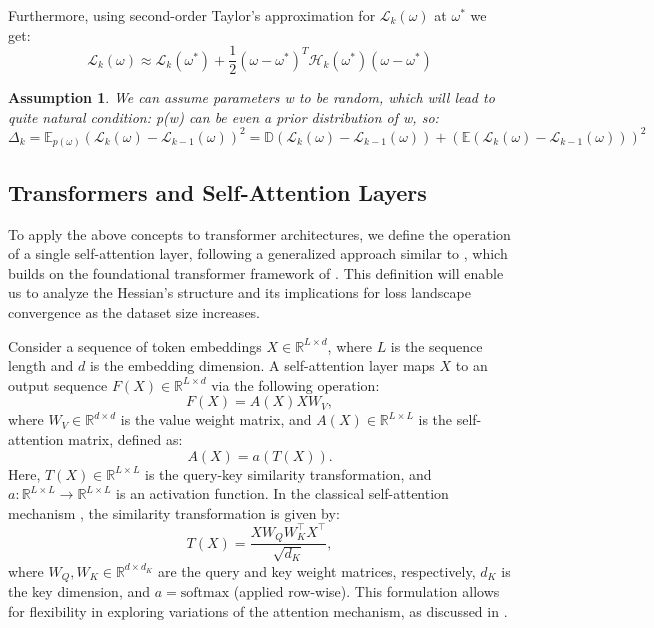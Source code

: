 \documentclass{article}
\newtheorem{assumption}{Assumption}
\begin{document}
Furthermore, using second-order Taylor's approximation for $\mathcal{L}_{k}(\omega)$ at $\omega^*$ we get:
$$\mathcal{L}_{k}(\omega) \approx \mathcal{L}_{k}(\omega^*) + \frac12 (\omega - \omega^*)^T \mathcal{H}_k(\omega^*)
  (\omega - \omega^*)$$

\begin{assumption}
  We can assume parameters w to be random, which will lead to quite natural condition: p(w) can be even a prior
  distribution of w, so: $$\Delta_{k} = \mathbb{E}_{p(\omega)} \left( \mathcal{L}_{k}(\omega) - \mathcal{L}_{k-1}(\omega)
    \right)^2 = \mathbb{D} \left( \mathcal{L}_{k}(\omega) - \mathcal{L}_{k-1}(\omega) \right) + \left( \mathbb{E} \left(
      \mathcal{L}_{k}(\omega) - \mathcal{L}_{k-1}(\omega) \right) \right)^2$$
\end{assumption}

\subsection{Transformers and Self-Attention Layers}
To apply the above concepts to transformer architectures, we define the operation of a single self-attention layer, following a generalized approach similar to \cite{ormaniec2024attentionhessian}, which builds on the foundational transformer framework of \cite{vaswani2017attention}. This definition will enable us to analyze the Hessian's structure and its implications for loss landscape convergence as the dataset size increases.

Consider a sequence of token embeddings $X \in \mathbb{R}^{L \times d}$, where $L$ is the sequence length and $d$ is the embedding dimension. A self-attention layer maps $X$ to an output sequence $F(X) \in \mathbb{R}^{L \times d}$ via the following operation:
\[
F(X) = A(X) X W_V,
\]
where $W_V \in \mathbb{R}^{d \times d}$ is the value weight matrix, and $A(X) \in \mathbb{R}^{L \times L}$ is the self-attention matrix, defined as:
\[
A(X) = a(T(X)).
\]
Here, $T(X) \in \mathbb{R}^{L \times L}$ is the query-key similarity transformation, and $a : \mathbb{R}^{L \times L} \to \mathbb{R}^{L \times L}$ is an activation function. In the classical self-attention mechanism \cite{vaswani2017attention}, the similarity transformation is given by:
\[
T(X) = \frac{X W_Q W_K^\top X^\top}{\sqrt{d_K}},
\]
where $W_Q, W_K \in \mathbb{R}^{d \times d_K}$ are the query and key weight matrices, respectively, $d_K$ is the key dimension, and $a = \text{softmax}$ (applied row-wise). This formulation allows for flexibility in exploring variations of the attention mechanism, as discussed in \cite{ormaniec2024attentionhessian}.
\end{document}
